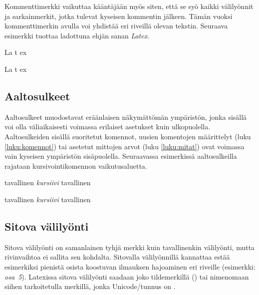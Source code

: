 Kommenttimerkki vaikuttaa kääntäjään myös siten, että se syö kaikki
välilyönnit ja sarkainmerkit, jotka tulevat kyseisen kommentin jälkeen.
Tämän vuoksi kommenttimerkin avulla voi yhdistää eri riveillä olevan
tekstin. Seuraava esimerkki tuottaa ladottuna ehjän sanan \emph{Latex}.

\begin{koodilohkosis}
  La%
    t%
      ex
\end{koodilohkosis}

\begin{tulossis}
  La%
    t%
      ex
\end{tulossis}

\subsection{Aaltosulkeet}
\label{luku:aaltosulkeet}

Aaltosulkeet \mbox{\koodi{\{\}}} muodostavat eräänlaisen näkymättömän
ympäristön, jonka sisällä voi olla väliaikaisesti voimassa erilaiset
asetukset kuin ulkopuolella. Aaltosulkeiden sisällä suoritetut komennot,
uusien komentojen määrittelyt (luku \ref{luku:komennot}) tai asetetut
mittojen arvot (luku \ref{luku:mitat}) ovat voimassa vain kyseisen
ympäristön sisäpuolella. Seuraavassa esimerkissä aaltosulkeilla rajataan
kursivointikomennon  vai\-ku\-tus\-aluetta.

\pagebreak[3]

\begin{koodilohkosis}
  tavallinen {\itshape kursiivi} tavallinen
\end{koodilohkosis}

\begin{tulossis}
  tavallinen {\itshape kursiivi} tavallinen
\end{tulossis}

\subsection{Sitova välilyönti}

Sitova välilyönti on samanlainen tyhjä merkki kuin tavallinenkin
välilyönti, mutta rivinvaihtoa ei sallita sen kohdalta. Sitovalla
välilyönnillä kannattaa estää esimerkiksi pienistä osista koostuvan
ilmauksen hajoaminen eri riveille (esimerkki: \emph{osa~5}). Latexissa
sitova välilyönti saadaan joko tildemerkillä (\koodi{\textasciitilde})
tai nimenomaan siihen tarkoitetulla merkillä, jonka Unicode\-/tunnus on
.

